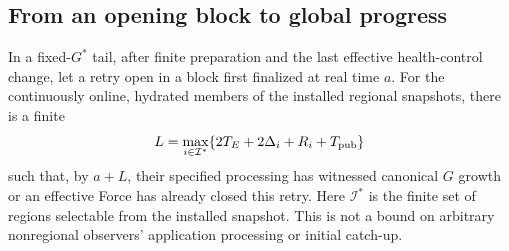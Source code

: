 \subsection{From an opening block to global progress}
\label{sec:v35-global-progress}
\begin{proposition}
\label{prop:v35-public-response}
In a fixed-$G^*$ tail, after finite preparation and the last effective
health-control change, let a retry open in a block first finalized at
real time $a$. For the continuously online, hydrated members of the
installed regional snapshots, there is a finite
\[
 L=\max_{i\in\mathcal I^*}
       \{2T_E+2\Delta_i+R_i+T_{\rm pub}\}
\]
such that, by $a+L$, their specified processing has witnessed canonical
$G$ growth or an effective Force has already closed this retry. Here
$\mathcal I^*$ is the finite set of regions selectable from the installed
snapshot. This is not a bound on arbitrary nonregional observers'
application processing or initial catch-up.
\end{proposition}
